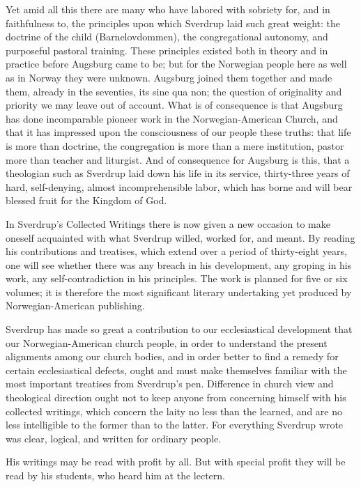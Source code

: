 Yet amid all this there are many who have labored with sobriety for, and in faithfulness to, the principles upon which Sverdrup laid such great weight: the doctrine of the child (Barnelovdommen), the congregational autonomy, and purposeful pastoral training. These principles existed both in theory and in practice before Augsburg came to be; but for the Norwegian people here as well as in Norway they were unknown. Augsburg joined them together and made them, already in the seventies, its sine qua non; the question of originality and priority we may leave out of account. What is of consequence is that Augsburg has done incomparable pioneer work in the Norwegian-American Church, and that it has impressed upon the consciousness of our people these truths: that life is more than doctrine, the congregation is more than a mere institution, pastor more than teacher and liturgist. And of consequence for Augsburg is this, that a theologian such as Sverdrup laid down his life in its service, thirty-three years of hard, self-denying, almost incomprehensible labor, which has borne and will bear blessed fruit for the Kingdom of God.

In Sverdrup’s Collected Writings there is now given a new occasion to make oneself acquainted with what Sverdrup willed, worked for, and meant. By reading his contributions and treatises, which extend over a period of thirty-eight years, one will see whether there was any breach in his development, any groping in his work, any self-contradiction in his principles. The work is planned for five or six volumes; it is therefore the most significant literary undertaking yet produced by Norwegian-American publishing.

Sverdrup has made so great a contribution to our ecclesiastical development that our Norwegian-American church people, in order to understand the present alignments among our church bodies, and in order better to find a remedy for certain ecclesiastical defects, ought and must make themselves familiar with the most important treatises from Sverdrup’s pen. Difference in church view and theological direction ought not to keep anyone from concerning himself with his collected writings, which concern the laity no less than the learned, and are no less intelligible to the former than to the latter. For everything Sverdrup wrote was clear, logical, and written for ordinary people.

His writings may be read with profit by all. But with special profit they will be read by his students, who heard him at the lectern.


